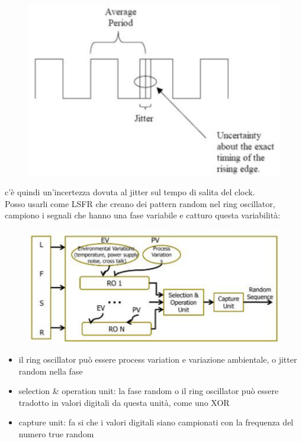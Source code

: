 \documentclass[oneside, 12pt]{extbook}
\begin{document}
\begin{figure}[!h]
	\includegraphics[scale=0.5]{immagini/hardware/jitter.png}
\end{figure}
c'è quindi un'incertezza dovuta al jitter sul tempo di salita del clock.
\\Posso usarli come LSFR che creano dei pattern random nel ring oscillator, campiono i segnali che hanno una fase variabile e catturo questa variabilità:\\
\begin{figure}[!h]
	\includegraphics[scale=0.5]{immagini/hardware/lfsr.png}
\end{figure}
\begin{itemize}
	\item il ring oscillator può essere process variation e variazione ambientale, o jitter random nella fase
	\item selection \& operation unit: la fase random o il ring oscillator può essere tradotto in valori digitali da questa unità, come uno XOR
	\item capture unit: fa si che i valori digitali siano campionati con la frequenza del numero true random
\end{itemize}
\end{document}

